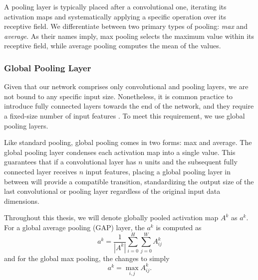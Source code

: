 A pooling layer is typically placed after a convolutional one, iterating its activation maps and systematically applying a specific operation over its receptive field.
We differentiate between two primary types of pooling: \emph{max} and \emph{average}.
As their names imply, max pooling selects the maximum value within its receptive field, while average pooling computes the mean of the values.
% 

\subsubsection{Global Pooling Layer}

Given that our network comprises only convolutional and pooling layers, we are not bound to any specific input size.
Nonetheless, it is common practice to introduce fully connected layers towards the end of the network, and they require a fixed-size number of input features \cite{cnns}.
To meet this requirement, we use global pooling layers.

Like standard pooling, global pooling comes in two forms: max and average.
The global pooling layer condenses each activation map into a single value.
This guarantees that if a convolutional layer has $n$ units and the subsequent fully connected layer receives $n$ input features, placing a global pooling layer in between will provide a compatible transition, standardizing the output size of the last convolutional or pooling layer regardless of the original input data dimensions.

Throughout this thesis, we will denote globally pooled activation map $A^k$ as $a^k$. For a global average pooling (GAP) layer, the $a^k$ is computed as
\begin{equation}\label{gap}
    a^k = \frac{1}{|A^k|} \sum_{i=0}^H \sum_{j=0}^W A^k_{ij}
\end{equation}
and for the global max pooling, the  changes to simply
\begin{equation}
    a^k = \max_{i,j} A^k_{ij}.
\end{equation}
